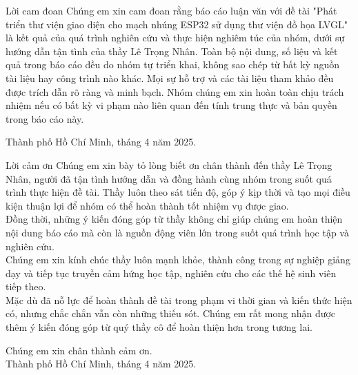 \begin{preface}{Lời cam đoan}
    \tab Chúng em xin cam đoan rằng báo cáo luận văn với đề tài "Phát triển thư viện giao diện cho mạch nhúng ESP32 sử dụng thư viện đồ họa LVGL" là kết quả của quá trình nghiên cứu và thực hiện nghiêm túc của nhóm, dưới sự hướng dẫn tận tình của thầy Lê Trọng Nhân. Toàn bộ nội dung, số liệu và kết quả trong báo cáo đều do nhóm tự triển khai, không sao chép từ bất kỳ nguồn tài liệu hay công trình nào khác. Mọi sự hỗ trợ và các tài liệu tham khảo đều được trích dẫn rõ ràng và minh bạch. Nhóm chúng em xin hoàn toàn chịu trách nhiệm nếu có bất kỳ vi phạm nào liên quan đến tính trung thực và bản quyền trong báo cáo này.
    \begin{flushright}
    Thành phố Hồ Chí Minh, tháng 4 năm 2025.
    \end{flushright}
    \end{preface}
    
    \newpage
    
    \begin{preface}{Lời cảm ơn}
    \tab Chúng em xin bày tỏ lòng biết ơn chân thành đến thầy Lê Trọng Nhân, người đã tận tình hướng dẫn và đồng hành cùng nhóm trong suốt quá trình thực hiện đề tài. Thầy luôn theo sát tiến độ, góp ý kịp thời và tạo mọi điều kiện thuận lợi để nhóm có thể hoàn thành tốt nhiệm vụ được giao.\\
    \tab Đồng thời, những ý kiến đóng góp từ thầy không chỉ giúp chúng em hoàn thiện nội dung báo cáo mà còn là nguồn động viên lớn trong suốt quá trình học tập và nghiên cứu.\\
    \tab Chúng em xin kính chúc thầy luôn mạnh khỏe, thành công trong sự nghiệp giảng dạy và tiếp tục truyền cảm hứng học tập, nghiên cứu cho các thế hệ sinh viên tiếp theo.\\
    \tab Mặc dù đã nỗ lực để hoàn thành đề tài trong phạm vi thời gian và kiến thức hiện có, nhưng chắc chắn vẫn còn những thiếu sót. Chúng em rất mong nhận được thêm ý kiến đóng góp từ quý thầy cô để hoàn thiện hơn trong tương lai.
    \begin{flushright}
    Chúng em xin chân thành cảm ơn.\\
    Thành phố Hồ Chí Minh, tháng 4 năm 2025.
    \end{flushright}
    \end{preface}
    
    \newpage
    
